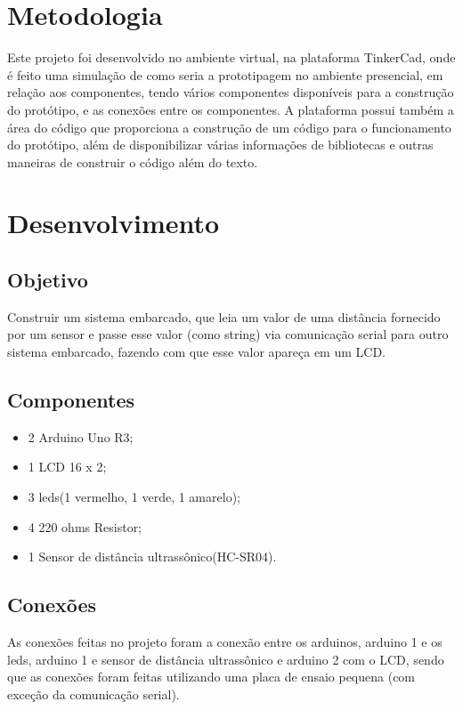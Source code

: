 \documentclass[conference]{IEEEtran}
\begin{document}
\section{Metodologia}



Este projeto foi desenvolvido no ambiente virtual, na plataforma TinkerCad, onde é feito uma simulação de como seria a prototipagem no ambiente presencial, em relação aos 
componentes, tendo vários componentes disponíveis para a construção do protótipo, e as conexões entre os componentes. A plataforma possui também a área do código que proporciona 
a construção de um código para o funcionamento do protótipo, além de disponibilizar várias informações de bibliotecas e outras maneiras de construir o código além do texto. 


\section{Desenvolvimento}


\subsection{Objetivo}\label{AA}
Construir um sistema embarcado, que leia um valor de uma distância fornecido por um sensor e passe esse valor (como string) via comunicação serial para outro
sistema embarcado, fazendo com que esse valor apareça em um LCD.

\subsection{Componentes}
\begin{itemize}
\item 2 Arduino Uno R3;
\item 1 LCD 16 x 2;
\item 3 leds(1 vermelho, 1 verde, 1 amarelo);
\item 4 220 ohms Resistor;
\item 1 Sensor de distância ultrassônico(HC-SR04).
\end{itemize}

\subsection{Conexões}
As conexões feitas no projeto foram a conexão entre os arduinos, arduino 1 e os leds, arduino 1 e sensor de distância ultrassônico e arduino 2 com o LCD, sendo que as conexões foram
feitas utilizando uma placa de ensaio pequena (com exceção da comunicação serial).
\end{document}
